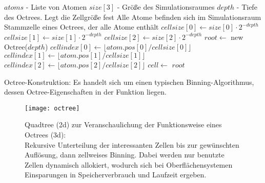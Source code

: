 \begin{algorithm}
  \begin{algorithmic}
    \Input $atoms$ - Liste von Atomen
    \Input $size[3]$ - Größe des Simulationsraumes
    \Input $depth$ - Tiefe des Octrees. Legt die Zellgröße fest
    \Assumption Alle Atome befinden sich im Simulationsraum
    \Result Stammzelle eines Octrees, der alle Atome enthält
    \State
    \State $cellsize[0] \gets size[0]\cdot2^{-depth}$
    \State $cellsize[1] \gets size[1]\cdot2^{-depth}$
    \State $cellsize[2] \gets size[2]\cdot2^{-depth}$
    \State $root \gets$ new Octree($depth$)
    \State $cellindex[0] \gets \lfloor atom.pos[0] / cellsize[0] \rfloor$
    \State $cellindex[1] \gets \lfloor atom.pos[1] / cellsize[1] \rfloor$
    \State $cellindex[2] \gets \lfloor atom.pos[2] / cellsize[2] \rfloor$
    \State $cell \gets$ 
    \State {}
    \EndFor
    \State \Return $root$
    \EndFunction
  \end{algorithmic}
  \label{alco:octree-construction}
  \caption[Octree-Konstruktion]{Octree-Konstruktion: Es handelt sich um einen typischen Binning-Algorithmus, dessen Octree-Eigenschaften in der Funktion  liegen.}
\end{algorithm}

\begin{figure}[tbhp]
  \centering
  \texttt{[image: octree]}
  \label{fig:octree}
  \caption[Quadtree-Veranschaulichung eines Octrees]{Quadtree (2d) zur Veranschaulichung der Funktionsweise eines Octrees (3d):\\
    Rekursive Unterteilung der interessanten Zellen bis zur gewünschten Auflösung, dann zellweises Binning.
    Dabei werden nur benutzte Zellen dynamisch allokiert, wodurch sich bei Oberflächensystemen Einsparungen in Speicherverbrauch und Laufzeit ergeben.
}
\end{figure}

